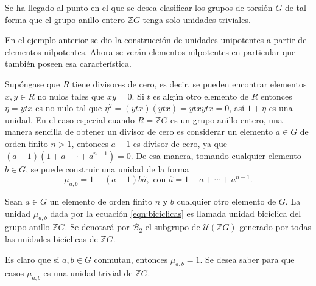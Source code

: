 Se ha llegado al punto en el que se desea clasificar los grupos de torsión $G$ de tal forma que el grupo-anillo entero $\mathds{Z}G$ tenga solo unidades triviales.

\begin{ejemplo}
En el ejemplo anterior se dio la construcción de unidades unipotentes a partir de elementos nilpotentes. Ahora se verán elementos nilpotentes en particular que también poseen esa característica. 

Supóngase que $R$ tiene divisores de cero, es decir, se pueden encontrar elementos $x,y \in R$ no nulos tales que $xy = 0$. Si $t$ es algún otro elemento de $R$ entonces $\eta =ytx$ es no nulo tal que $\eta ^2 = (ytx)(ytx) = ytxytx = 0$, así $1+\eta$ es una unidad. En el caso especial cuando $R =\mathds{Z}G$ es un grupo-anillo entero, una manera sencilla de obtener un divisor de cero es considerar un elemento $a \in G$ de orden finito $ n >1$, entonces $a-1$ es divisor de cero, ya que $(a-1)(1+a+\cdot+a^{n-1})=0$. De esa manera, tomando cualquier elemento $b \in G$, se puede construir una unidad de la forma 
\begin{equation}\label{eqn:biciclicas}
\mu_{a,b} = 1+(a-1)b\hat{a}, \mbox{ con } \hat{a} = 1+a+\cdots+a^{n-1}.
\end{equation}
\end{ejemplo}

\begin{definicion}
Sean $a \in G$ un elemento de orden finito $n$ y $b$ cualquier otro elemento de $G$. La unidad $\mu_{a,b}$ dada por la ecuación \ref{eqn:biciclicas} es llamada unidad bicíclica del grupo-anillo $\mathds{Z}G$. Se denotará por $\mathcal{B}_2$ el subgrupo de $\mathcal{U}(\mathds{Z}G)$ generado por todas las unidades bicíclicas de $\mathds{Z}G$.
\end{definicion}

Es claro que si $a,b \in G$ conmutan, entonces $\mu_{a,b} = 1$. Se desea saber para que casos $\mu_{a,b}$ es una unidad trivial de $\mathds{Z}G$.

